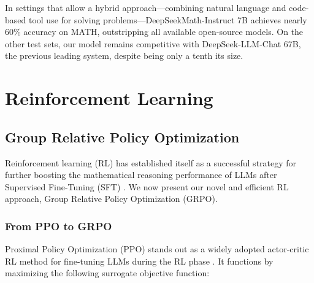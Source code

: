 In settings that allow a hybrid approach—combining natural language and code-based tool use for solving problems—DeepSeekMath-Instruct 7B achieves nearly 60\% accuracy on MATH, outstripping all available open-source models. On the other test sets, our model remains competitive with DeepSeek-LLM-Chat 67B, the previous leading system, despite being only a tenth its size.

\section{Reinforcement Learning}

\subsection{Group Relative Policy Optimization} Reinforcement learning (RL) has established itself as a successful strategy for further boosting the mathematical reasoning performance of LLMs after Supervised Fine-Tuning (SFT) \citep{wang2023math, wizardmath}. We now present our novel and efficient RL approach, Group Relative Policy Optimization (GRPO).

\subsubsection{From PPO to GRPO} Proximal Policy Optimization (PPO) \citep{schulman2017proximal} stands out as a widely adopted actor-critic RL method for fine-tuning LLMs during the RL phase \citep{ouyang2022training}. It functions by maximizing the following surrogate objective function:


